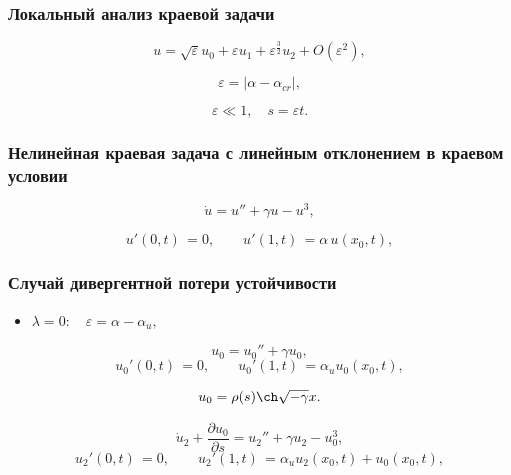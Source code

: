 \documentclass[fullscreen=true, unicode, bookmarks=false]{beamer}
\begin{document}
\begin{frame}
\frametitle{ Локальный анализ краевой задачи }

\begin{equation}
	u = \sqrt{\varepsilon}u_0 + \varepsilon u_1 + \varepsilon^{\frac{3}{2}} u_2 + O(\varepsilon^2),
\end{equation}

\bigskip

$$ \varepsilon = | \alpha - \alpha_{cr} |, $$

$$ \varepsilon \ll 1, \quad s = \varepsilon t. $$

\end{frame}

\begin{frame}
\frametitle{ Нелинейная краевая задача с линейным отклонением в краевом условии }
 
\begin{equation}
	\dot u = u'' + \gamma u - u^3,	
\end{equation}

\vfill

\begin{equation}
	u'(0, t) \, = 0, \qquad u'(1, t) \, = \alpha\,u(x_0, t),
\end{equation}

\end{frame}

\begin{frame}
\frametitle{ Случай дивергентной потери устойчивости }

\begin{itemize}
\item { $ \lambda = 0: \quad \varepsilon=\alpha-\alpha_u, $
}
\end{itemize}

\medskip
\pause

\begin{equation}
	u_0 = u_0'' + \gamma u_0,
\end{equation}
\begin{equation}
	u_0'(0, t) \, = 0, \qquad u_0'(1, t) \, = \alpha_u u_0(x_0, t),
\end{equation}

$$ u_0 = \rho(s) \ch \sqrt{-\gamma} x. $$

\medskip

\begin{equation}
	\dot u_2 + \frac{\partial u_0}{\partial s} = u_2'' + \gamma u_2 - u_0^3,
\end{equation}
\begin{equation}
	u_2'(0, t) \, = 0, \qquad u_2'(1, t) \, = \alpha_u u_2(x_0, t) + u_0(x_0, t),
\end{equation}

\end{frame}
\end{document}
